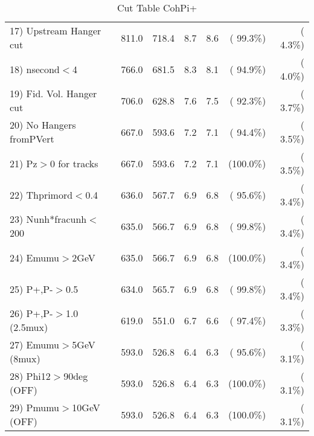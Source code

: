 \begin{table}[h!]
\begin{tabular}{||l||r|r|r|r|r|r||}
 17) Upstream Hanger cut  &        811.0 &        718.4 &          8.7 &          8.6 & ( 99.3\%) & (  4.3\%) \\
 18) nsecond$<$4          &        766.0 &        681.5 &          8.3 &          8.1 & ( 94.9\%) & (  4.0\%) \\
 19) Fid. Vol. Hanger cut &        706.0 &        628.8 &          7.6 &          7.5 & ( 92.3\%) & (  3.7\%) \\
 20) No Hangers fromPVert &        667.0 &        593.6 &          7.2 &          7.1 & ( 94.4\%) & (  3.5\%) \\
 21) Pz$>$0 for tracks    &        667.0 &        593.6 &          7.2 &          7.1 & (100.0\%) & (  3.5\%) \\
 22) Thprimord$<$0.4      &        636.0 &        567.7 &          6.9 &          6.8 & ( 95.6\%) & (  3.4\%) \\
 23) Nunh*fracunh$<$200   &        635.0 &        566.7 &          6.9 &          6.8 & ( 99.8\%) & (  3.4\%) \\
 24) Emumu$>$2GeV         &        635.0 &        566.7 &          6.9 &          6.8 & (100.0\%) & (  3.4\%) \\
 25) P+,P-$>$0.5          &        634.0 &        565.7 &          6.9 &          6.8 & ( 99.8\%) & (  3.4\%) \\
 26) P+,P-$>$1.0 (2.5mux) &        619.0 &        551.0 &          6.7 &          6.6 & ( 97.4\%) & (  3.3\%) \\
 27) Emumu$>$5GeV  (8mux) &        593.0 &        526.8 &          6.4 &          6.3 & ( 95.6\%) & (  3.1\%) \\
 28) Phi12$>$90deg  (OFF) &        593.0 &        526.8 &          6.4 &          6.3 & (100.0\%) & (  3.1\%) \\
 29) Pmumu$>$10GeV  (OFF) &        593.0 &        526.8 &          6.4 &          6.3 & (100.0\%) & (  3.1\%) \\
 \hline
 \hline
 \end{tabular}
 \caption{Cut Table  CohPi+   }
 \label{tab-cutcohjpsi-mumu_cohpip}
 \end{table}
